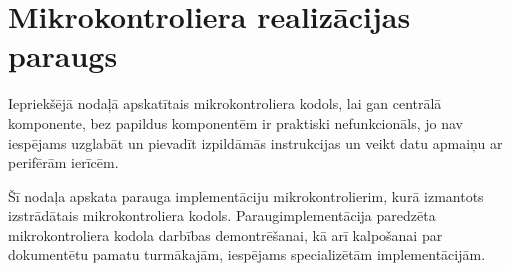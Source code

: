\section{Mikrokontroliera realizācijas paraugs}
	Iepriekšējā nodaļā apskatītais mikrokontroliera kodols, lai gan centrālā
	komponente, bez papildus komponentēm ir praktiski nefunkcionāls, jo
	nav iespējams uzglabāt un pievadīt izpildāmās instrukcijas un veikt
	datu apmaiņu ar perifērām ierīcēm.
	
	
	Šī nodaļa apskata parauga implementāciju mikrokontrolierim, kurā
	izmantots izstrādātais mikrokontroliera kodols. 
	Paraug\-implementācija paredzēta mikrokontroliera kodola 
	darbības demontrēšanai, kā arī kalpošanai par dokumentētu pamatu 
	turmākajām, iespējams specializētām implementācijām.
	
	
	
	 \clearpage %
	
